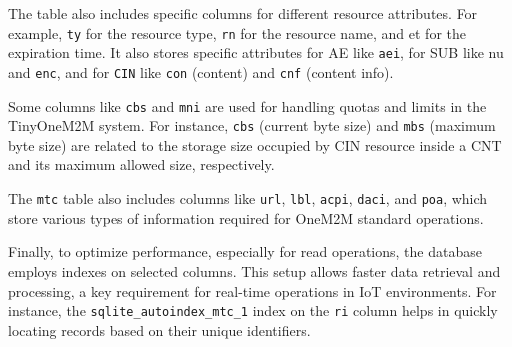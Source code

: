 \documentclass[a4paper,fleqn]{cas-dc}
\begin{document}
The table also includes specific columns for different resource attributes. For example, \texttt{ty} for the resource type, \texttt{rn} for the resource name, and et for the expiration time. It also stores specific attributes for AE like \texttt{aei}, for SUB like nu and \texttt{enc}, and for \texttt{CIN} like \texttt{con} (content) and \texttt{cnf} (content info).

Some columns like \texttt{cbs} and \texttt{mni} are used for handling quotas and limits in the TinyOneM2M system. For instance, \texttt{cbs} (current byte size) and \texttt{mbs} (maximum byte size) are related to the storage size occupied by CIN resource inside a CNT and its maximum allowed size, respectively.

The \texttt{mtc} table also includes columns like \texttt{url}, \texttt{lbl}, \texttt{acpi}, \texttt{daci}, and \texttt{poa}, which store various types of information required for OneM2M standard operations.

Finally, to optimize performance, especially for read operations, the database employs indexes on selected columns. This setup allows faster data retrieval and processing, a key requirement for real-time operations in IoT environments. For instance, the \texttt{sqlite\_autoindex\_mtc\_1} index on the \texttt{ri} column helps in quickly locating records based on their unique identifiers.
\end{document}
